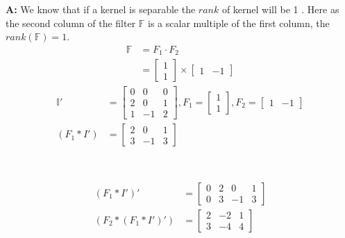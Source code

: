 \documentclass[english,a4paper,12pt]{article}
\begin{document}
\begin{enumerate}
{\textbf{A:} We know that if a kernel is separable the $rank$ of kernel will be 1 . Here as the second column of the filter $\mathbb{F}$ is a scalar multiple of the first column, the $rank(\mathbb{F})=1$.\\
\begin{align*}
    \mathbb{F} &= F_1\cdot F_2 \\ 
    &=\begin{bmatrix}
    1\\
    1
    \end{bmatrix} \times
    \begin{bmatrix}
    1 & -1
    \end{bmatrix} 
\end{align*}
\begin{align*}
    \mathbb{I'} &= \begin{bmatrix}
0 & 0 & 0  \\ 
2 & 0 & 1  \\
1 & -1 & 2
\end{bmatrix}, 
    F_1 = \begin{bmatrix}
    1 \\
    1
    \end{bmatrix},
    F_2=\begin{bmatrix}
    1 & -1
    \end{bmatrix}
    \\ 
    (F_1* I')&=\left[\begin{array}{cccc}
2 & 0 & 1\\
3 & -1 & 3 
\end{array}\right] \\ 
\end{align*}
 \\
 \\ 
\begin{align*}
(F_1* I')'& = \begin{bmatrix}
0 & 2 & 0 & 1 \\
0 & 3 & -1 & 3 
\end{bmatrix}\\
(F_2*(F_1*I')') &= \left[\begin{array}{ccc}
2 & -2 & 1 \\
3 & -4 & 4
\end{array}\right]
\end{align*}

}
\end{enumerate}
\end{document}
